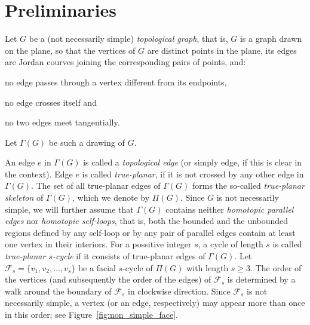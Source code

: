 \section{Preliminaries}
\label{sec:preliminaries}

Let $G$ be a (not necessarily simple) \emph{topological graph}, that is, $G$ is a graph drawn on the plane, so that the vertices of $G$ are distinct points in the plane, its edges are Jordan courves joining the corresponding pairs of points, and:%
%
\begin{inparaenum}[(i)]
\item no edge passes through a vertex different from its endpoints, 
\item no edge crosses itself and 
\item no two edges meet tangentially.
\end{inparaenum}
Let $\Gamma(G)$ be such a drawing of $G$.

An edge $e$ in $\Gamma(G)$ is called a \emph{topological edge} (or simply edge, if this is clear in the context). Edge $e$ is called \emph{true-planar}, if it is not crossed by any other edge in $\Gamma(G)$. The set of all true-planar edges of $\Gamma(G)$ forms the so-called \emph{true-planar skeleton} of $\Gamma(G)$, which we denote by $\Pi(G)$. Since $G$ is not necessarily simple, we will further assume that $\Gamma(G)$ contains neither \emph{homotopic parallel edges} nor \emph{homotopic self-loops}, that is, both the bounded and the unbounded regions defined by any self-loop or by any pair of parallel edges contain at least one vertex in their interiors. For a possitive integer $s$, a cycle of length $s$ is called \emph{true-planar $s$-cycle} if it consists of true-planar edges of $\Gamma(G)$. Let $\mathcal{F}_s=\{v_1,v_2,\ldots,v_s\}$ be a facial $s$-cycle of $\Pi(G)$ with length $s \geq 3$.  The order of the vertices (and subsequently the order of the edges) of $\mathcal{F}_s$ is determined by a walk around the boundary of $\mathcal{F}_s$ in clockwise direction. Since $\mathcal{F}_s$ is not necessarily simple, a vertex (or an edge, respectively) may appear more than once in this order; see Figure~\ref{fig:non_simple_face}.

